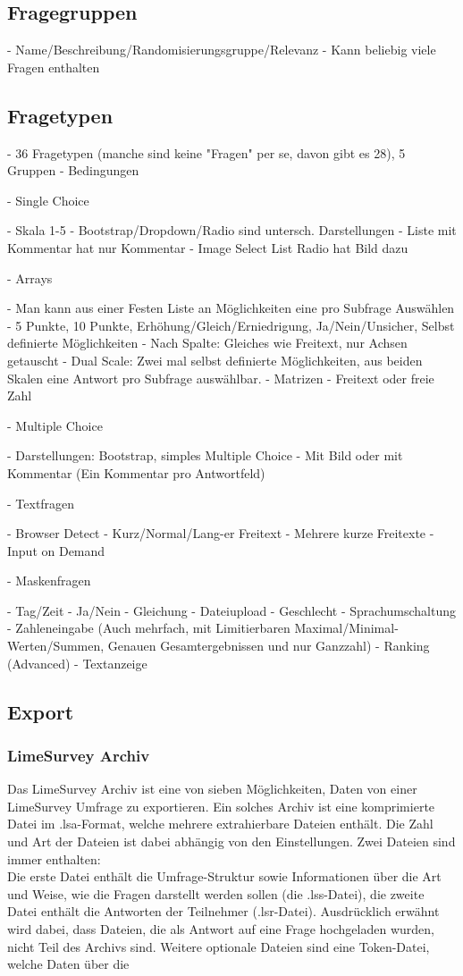 \subsection{Fragegruppen}

- Name/Beschreibung/Randomisierungsgruppe/Relevanz
- Kann beliebig viele Fragen enthalten

\subsection{Fragetypen}

- 36 Fragetypen (manche sind keine "Fragen" per se, davon gibt es 28), 5 Gruppen
- Bedingungen

- Single Choice

- Skala 1-5
- Bootstrap/Dropdown/Radio sind untersch. Darstellungen
- Liste mit Kommentar hat nur Kommentar
- Image Select List Radio hat Bild dazu

- Arrays

- Man kann aus einer Festen Liste an Möglichkeiten eine pro Subfrage Auswählen
- 5 Punkte, 10 Punkte, Erhöhung/Gleich/Erniedrigung, Ja/Nein/Unsicher, Selbst definierte Möglichkeiten
- Nach Spalte: Gleiches wie Freitext, nur Achsen getauscht
- Dual Scale: Zwei mal selbst definierte Möglichkeiten, aus beiden Skalen eine Antwort pro Subfrage auswählbar.
- Matrizen
- Freitext oder freie Zahl

- Multiple Choice

- Darstellungen: Bootstrap, simples Multiple Choice
- Mit Bild oder mit Kommentar (Ein Kommentar pro Antwortfeld)

- Textfragen

- Browser Detect
- Kurz/Normal/Lang-er Freitext
- Mehrere kurze Freitexte
- Input on Demand

- Maskenfragen

- Tag/Zeit
- Ja/Nein
- Gleichung
- Dateiupload
- Geschlecht
- Sprachumschaltung
- Zahleneingabe (Auch mehrfach, mit Limitierbaren Maximal/Minimal-Werten/Summen, Genauen Gesamtergebnissen und nur Ganzzahl)
- Ranking (Advanced)
- Textanzeige

\subsection{Export}
\subsubsection{LimeSurvey Archiv}
\label{m:lsa}
Das LimeSurvey Archiv ist eine von sieben Möglichkeiten, Daten von einer LimeSurvey Umfrage zu exportieren.
Ein solches Archiv ist eine komprimierte Datei im .lsa-Format, welche mehrere extrahierbare Dateien enthält.
Die Zahl und Art der Dateien ist dabei abhängig von den Einstellungen. Zwei Dateien sind immer enthalten:\\
Die erste Datei enthält die Umfrage-Struktur sowie Informationen über die Art und Weise, wie die Fragen darstellt werden sollen (die .lss-Datei), die zweite Datei enthält die Antworten der Teilnehmer (.lsr-Datei).
Ausdrücklich erwähnt wird dabei, dass Dateien, die als Antwort auf eine Frage hochgeladen wurden, nicht Teil des Archivs sind.
Weitere optionale Dateien sind eine Token-Datei, welche Daten über die %

